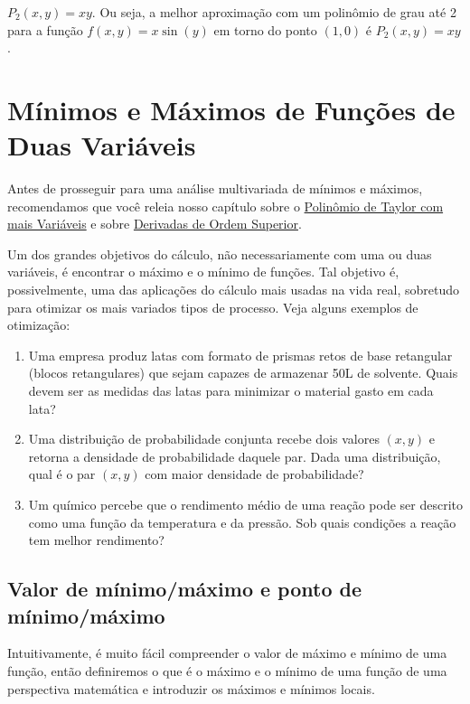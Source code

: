\documentclass[
  portuguese,
  letterpaper,
  DIV=11,
  numbers=noendperiod]{scrreport}
\providecommand{\tightlist}{%
  \setlength{\itemsep}{0pt}\setlength{\parskip}{0pt}}
\begin{document}
\(P_2(x,y) = xy\). Ou seja, a melhor aproximação com um polinômio de
grau até 2 para a função \(f(x,y)=x \sin(y)\) em torno do ponto
\((1,0)\) é \(P_2(x,y)=xy\).

\chapter{Mínimos e Máximos de Funções de Duas
Variáveis}\label{muxednimos-e-muxe1ximos-de-funuxe7uxf5es-de-duas-variuxe1veis}

Antes de prosseguir para uma análise multivariada de mínimos e máximos,
recomendamos que você releia nosso capítulo sobre o
\hyperref[polinuxf4mio-de-taylor-de-duas-variuxe1veis]{Polinômio de
Taylor com mais Variáveis} e sobre
\hyperref[derivadas-de-ordem-superior]{Derivadas de Ordem Superior}.

Um dos grandes objetivos do cálculo, não necessariamente com uma ou duas
variáveis, é encontrar o máximo e o mínimo de funções. Tal objetivo é,
possivelmente, uma das aplicações do cálculo mais usadas na vida real,
sobretudo para otimizar os mais variados tipos de processo. Veja alguns
exemplos de otimização:

\begin{enumerate}
\def\labelenumi{\arabic{enumi}.}
\tightlist
\item
  Uma empresa produz latas com formato de prismas retos de base
  retangular (blocos retangulares) que sejam capazes de armazenar 50L de
  solvente. Quais devem ser as medidas das latas para minimizar o
  material gasto em cada lata?
\item
  Uma distribuição de probabilidade conjunta recebe dois valores
  \((x,y)\) e retorna a densidade de probabilidade daquele par. Dada uma
  distribuição, qual é o par \((x,y)\) com maior densidade de
  probabilidade?
\item
  Um químico percebe que o rendimento médio de uma reação pode ser
  descrito como uma função da temperatura e da pressão. Sob quais
  condições a reação tem melhor rendimento?
\end{enumerate}

\section{Valor de mínimo/máximo e ponto de
mínimo/máximo}\label{valor-de-muxednimomuxe1ximo-e-ponto-de-muxednimomuxe1ximo-1}

Intuitivamente, é muito fácil compreender o valor de máximo e mínimo de
uma função, então definiremos o que é o máximo e o mínimo de uma função
de uma perspectiva matemática e introduzir os máximos e mínimos locais.
\end{document}
